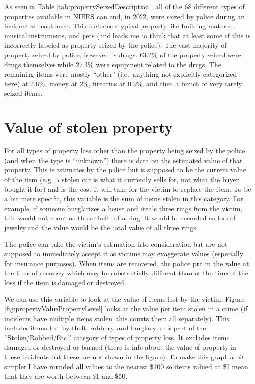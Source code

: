 \documentclass[
]{krantz}
\begin{document}
As seen in Table \ref{tab:propertySeizedDescription}, all of
the 68 different types of properties available in NIBRS can
and, in 2022, were seized by police during an incident at
least once. This includes atypical property like building
material, musical instruments, and pets (and leads me to
think that at least some of this is incorrectly labeled as
property seized by the police). The vast majority of
property seized by police, however, is drugs. 63.2\% of the
property seized were drugs themselves while 27.3\% were
equipment related to the drugs. The remaining items were
mostly ``other'' (i.e.~anything not explicitly categorized
here) at 2.6\%, money at 2\%, firearms at 0.9\%, and then a
bunch of very rarely seized items.

\section{Value of stolen
property}\label{value-of-stolen-property}

For all types of property loss other than the property being
seized by the police (and when the type is ``unknown'')
there is data on the estimated value of that property. This
is estimates by the police but is supposed to be the current
value of the item (e.g.~a stolen car is what it currently
sells for, not what the buyer bought it for) and is the cost
it will take for the victim to replace the item. To be a bit
more specific, this variable is the sum of items stolen in
this category. For example, if someone burglarizes a house
and steals three rings from the victim, this would not count
as three thefts of a ring. It would be recorded as loss of
jewelry and the value would be the total value of all three
rings.

The police can take the victim's estimation into
consideration but are not supposed to immediately accept it
as victims may exaggerate values (especially for insurance
purposes). When items are recovered, the police put in the
value at the time of recovery which may be substantially
different than at the time of the loss if the item is
damaged or destroyed.

We can use this variable to look at the value of items lost
by the victim. Figure \ref{fig:propertyValuePropertyLevel}
looks at the value per item stolen in a crime (if incidents
have multiple items stolen, this counts them all
separately). This includes items lost by theft, robbery, and
burglary so is part of the ``Stolen/Robbed/Etc.'' category
of types of property loss. It excludes items damaged or
destroyed or burned (there is info about the value of
property in these incidents but these are not shown in the
figure). To make this graph a bit simpler I have rounded all
values to the nearest \$100 so items valued at \$0 mean that
they are worth between \$1 and \$50.
\end{document}
